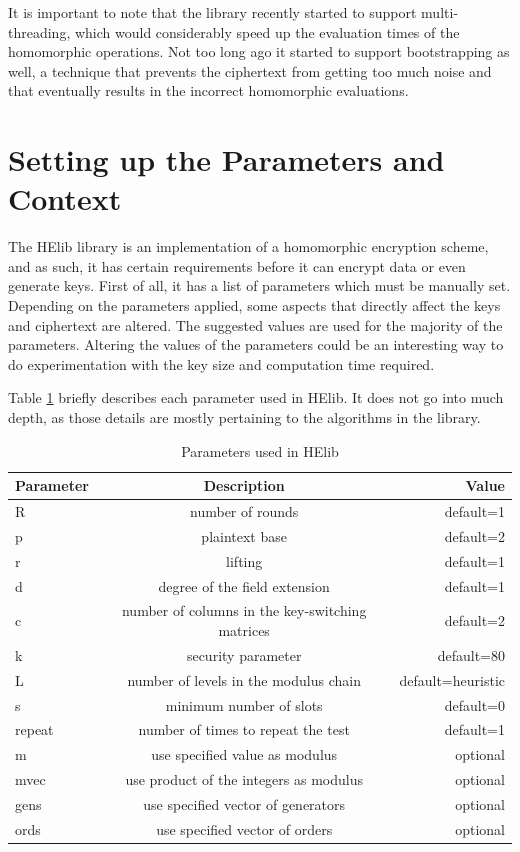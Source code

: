 It is important to note that the library recently started to support multi-threading, which would considerably speed up the evaluation times of the homomorphic operations. Not too long ago it started to support bootstrapping as well, a technique that prevents the ciphertext from getting too much noise and that eventually results in the incorrect homomorphic evaluations.

\section{Setting up the Parameters and Context}

The HElib library is an implementation of a homomorphic encryption scheme, and as such, it has certain requirements before it can encrypt data or even generate keys. First of all, it has a list of parameters which must be manually set. Depending on the parameters applied, some aspects that directly affect the keys and ciphertext are altered. The suggested values are used for the majority of the parameters. Altering the values of the parameters could be an interesting way to do experimentation with the key size and computation time required.

Table \ref{tbl:parameters} briefly describes each parameter used in HElib. It does not go into much depth, as those details are mostly pertaining to the algorithms in the library.

\begin{table}[h]
  \caption{Parameters used in HElib}
  \label{tbl:parameters}
\centering
  \begin{tabular}{|l|c|r|}
    \hline
    \textbf{Parameter} & \textbf{Description} & \textbf{Value} \\ \hline
    R  &     number of rounds &  default=1     \\ \hline
    p  &     plaintext base  & default=2  \\ \hline
    r  &     lifting  & default=1  \\ \hline
    d  &     degree of the field extension  & default=1  \\ \hline
    c  &     number of columns in the key-switching matrices  & default=2  \\ \hline
    k  &     security parameter & default=80  \\ \hline
    L  &     number of levels in the modulus chain  & default=heuristic  \\ \hline
    s  &     minimum number of slots  & default=0  \\ \hline
    repeat &  number of times to repeat the test & default=1  \\ \hline
    m   &    use specified value as modulus & optional  \\ \hline
    mvec &   use product of the integers as  modulus & optional \\ \hline
    gens &   use specified vector of generators & optional \\ \hline
    ords  &  use specified vector of orders & optional \\ \hline
  \end{tabular}
\end{table}


